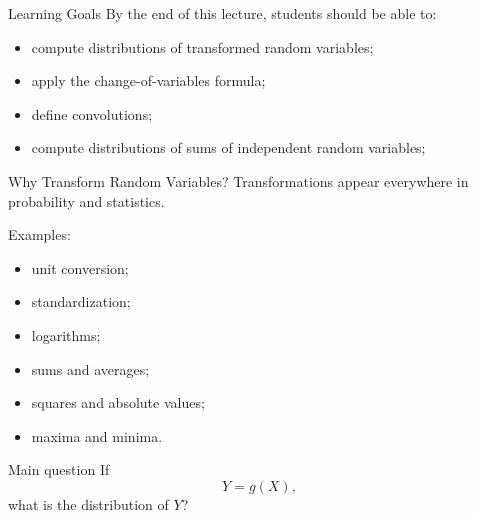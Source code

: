 \setcounter{framenumber}{0}

\begin{frame}
  \titlepage
\end{frame}

\begin{frame}{Learning Goals}
By the end of this lecture, students should be able to:
\begin{itemize}
    \item compute distributions of transformed random variables;
    \item apply the change-of-variables formula;
    \item define convolutions;
    \item compute distributions of sums of independent random variables;
\end{itemize}
\end{frame}


\begin{frame}{Why Transform Random Variables?}
Transformations appear everywhere in probability and statistics.

\vspace{0.25cm}

Examples:
\begin{itemize}
    \item unit conversion;
    \item standardization;
    \item logarithms;
    \item sums and averages;
    \item squares and absolute values;
    \item maxima and minima.
\end{itemize}

\vspace{0.25cm}

\begin{keybox}{Main question}
If
\[
Y=g(X),
\]
what is the distribution of $Y$?
\end{keybox}
\end{frame}






